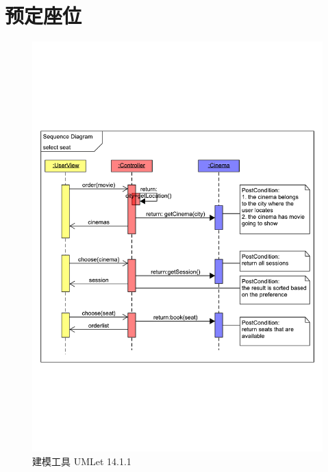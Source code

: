 \documentclass[a4paper]{article}
\begin{document}
  \section{预定座位}
    \begin{figure}[H]
      \centering
      \includegraphics[width=\textwidth]{sequence_1.pdf}
      \caption{建模工具 UMLet 14.1.1}
    \end{figure}
\end{document}
